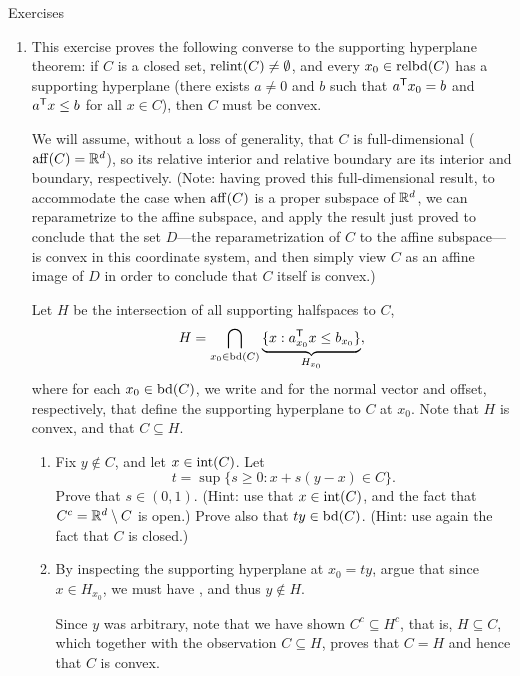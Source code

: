 \begin{xcb}{Exercises}
\begin{enumerate}[label=\thechapter.\arabic*]
\settowidth{\leftmargini}{0.00.\hskip\labelsep}
\item \label{ex:converse_supporting_hyperplane}
  This exercise proves the following converse to the supporting hyperplane
  theorem: if $C$ is a closed set, $\operatorname{relint}(C) \not= \emptyset$, and every $x_0
  \in \operatorname{relbd}(C)$ has a supporting hyperplane (there exists $a\not=0$ and $b$  
  such that $a^{\mathsf{T}} x_0 = b$ and $a^{\mathsf{T}} x \leq b$ for all $x \in C$), then $C$     
  must be convex.   

  We will assume, without a loss of generality, that $C$ is full-dimensional
  ($\operatorname{aff}(C) = \mathbb{R}^d$), so its relative interior and relative boundary are its
  interior and boundary, respectively. (Note: having proved this
  full-dimensional result, to accommodate the case when $\operatorname{aff}(C)$ is a proper
  subspace of $\mathbb{R}^d$, we can reparametrize to the affine subspace, and apply the
  result just proved to conclude that the set $D$---the reparametrization of $C$
  to the affine subspace---is convex in this coordinate system, and then simply
  view $C$ as an affine image of $D$ in order to conclude that $C$ itself is
  convex.)  

  Let $H$ be the intersection of all supporting halfspaces to $C$, 
  \[
  H = \bigcap_{x_0 \in \operatorname{bd}(C)} \underbrace{\{ x :  a_{x_0}^{\mathsf{T}} x \leq
    b_{x_0} \}}_{H_{x_0}}, 
  \]
  where for each $x_0 \in \operatorname{bd}(C)$, we write  and
   for the normal vector and offset, respectively, that define
  the supporting hyperplane to $C$ at $x_0$. Note that $H$ is convex, and that
  $C \subseteq H$.    

\begin{enumerate}[label=\alph*.]
\item Fix $y \notin C$, and let $x \in \operatorname{int}(C)$. Let
  \[
  t = \sup \{ s \geq 0 : x + s (y - x) \in C \}. 
  \]
  Prove that $s \in (0,1)$. (Hint: use that $x \in \operatorname{int}(C)$, and the fact
  that $C^c = \mathbb{R}^d \setminus C$ is open.) Prove also that $t y \in
  \operatorname{bd}(C)$. (Hint: use again the fact that $C$ is closed.) 

\item By inspecting the supporting hyperplane at $x_0 = t y$, argue that since
  $x \in H_{x_0}$, we must have , and thus $y \notin 
  H$. 

  \smallskip
  Since $y$ was arbitrary, note that we have shown $C^c \subseteq H^c$, that is,
  $H \subseteq C$, which together with the observation $C \subseteq H$, proves
  that $C = H$ and hence that $C$ is convex. 
\end{enumerate}


\end{enumerate}
\end{xcb}
